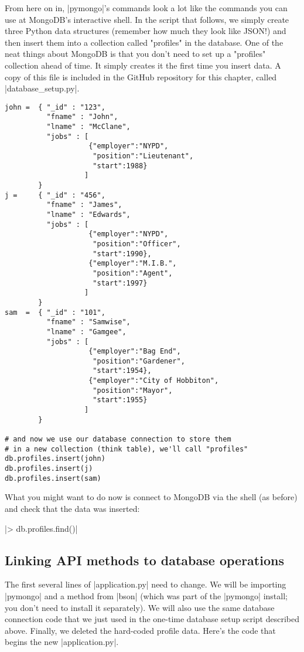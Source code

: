 \documentclass[11pt]{book}
\begin{document}
From here on in, |pymongo|'s commands look a lot like the commands you can use at MongoDB's interactive shell.  In the script that follows, we simply create three Python data structures (remember how much they look like JSON!) and then insert them into a collection called "profiles" in the database.  One of the neat things about MongoDB is that you don't need to set up a "profiles" collection ahead of time.  It simply creates it the first time you insert data.  A copy of this file is included in the GitHub repository for this chapter, called |database_setup.py|.

\begin{verbatim}
john =  { "_id" : "123",
          "fname" : "John",
          "lname" : "McClane",
          "jobs" : [ 
                    {"employer":"NYPD",
                     "position":"Lieutenant",
                     "start":1988}
                   ]
        }
j =     { "_id" : "456",
          "fname" : "James",
          "lname" : "Edwards",
          "jobs" : [
                    {"employer":"NYPD",
                     "position":"Officer",
                     "start":1990},
                    {"employer":"M.I.B.",
                     "position":"Agent",
                     "start":1997}
                   ]
        }
sam  =  { "_id" : "101",
          "fname" : "Samwise",
          "lname" : "Gamgee",
          "jobs" : [
                    {"employer":"Bag End",
                     "position":"Gardener",
                     "start":1954},
                    {"employer":"City of Hobbiton",
                     "position":"Mayor",
                     "start":1955}
                   ]
        }
        
# and now we use our database connection to store them
# in a new collection (think table), we'll call "profiles"
db.profiles.insert(john)
db.profiles.insert(j)
db.profiles.insert(sam)
\end{verbatim}

What you might want to do now is connect to MongoDB via the shell (as before) and check that the data was inserted:

|> db.profiles.find()|

\subsection*{Linking API methods to database operations}

The first several lines of |application.py| need to change.  We will be importing |pymongo| and a method from |bson| (which was part of the |pymongo| install; you don't need to install it separately).  We will also use the same database connection code that we just used in the one-time database setup script described above.  Finally, we deleted the hard-coded profile data.  Here's the code that begins the new |application.py|.
\end{document}
